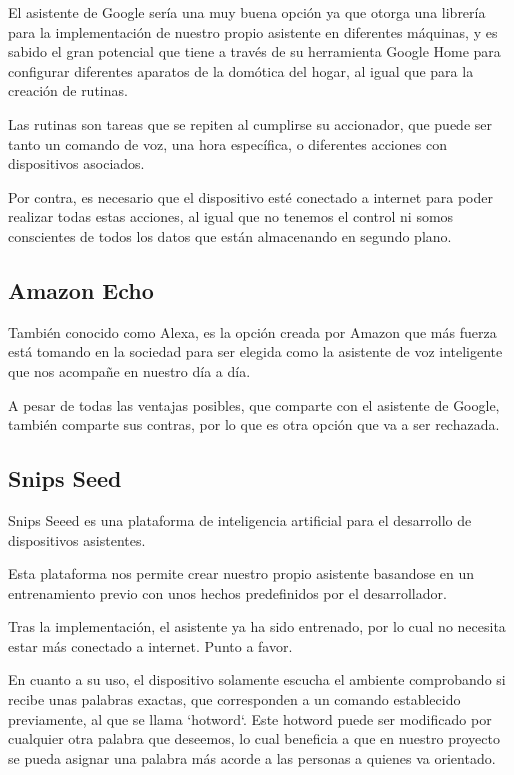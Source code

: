 El asistente de Google sería una muy buena opción ya que otorga una librería para la implementación de nuestro propio asistente en diferentes máquinas, y es sabido el gran potencial que tiene a través de su herramienta Google Home para configurar diferentes aparatos de la domótica del hogar, al igual que para la creación de rutinas.

Las rutinas son tareas que se repiten al cumplirse su accionador, que puede ser tanto un comando de voz, una hora específica, o diferentes acciones con dispositivos asociados.

Por contra, es necesario que el dispositivo esté conectado a internet para poder realizar todas estas acciones, al igual que no tenemos el control ni somos conscientes de todos los datos que están almacenando en segundo plano.

\subsection{Amazon Echo}

También conocido como Alexa, es la opción creada por Amazon que más fuerza está tomando en la sociedad para ser elegida como la asistente de voz inteligente que nos acompañe en nuestro día a día.

A pesar de todas las ventajas posibles, que comparte con el asistente de Google, también comparte sus contras, por lo que es otra opción que va a ser rechazada.

\subsection{Snips Seed}

Snips Seeed es una  plataforma de inteligencia artificial para el desarrollo de dispositivos asistentes.

Esta plataforma nos permite crear nuestro propio asistente basandose en un entrenamiento previo con unos hechos predefinidos por el desarrollador.

Tras la implementación, el asistente ya ha sido entrenado, por lo cual no necesita estar más conectado a internet. Punto a favor.

En cuanto a su uso, el dispositivo solamente escucha el ambiente comprobando si recibe unas palabras exactas, que corresponden a un comando establecido previamente, al que se llama ‘hotword‘. 
Este hotword puede ser modificado por cualquier otra palabra que deseemos, lo cual beneficia a que en nuestro proyecto se pueda asignar una palabra más acorde a las personas a quienes va orientado.

